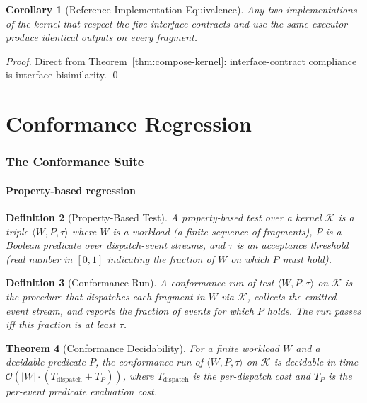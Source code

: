\documentclass[twocolumn,11pt,a4paper]{article}
\newtheorem{theorem}{Theorem}[section]
\newtheorem{corollary}[theorem]{Corollary}
\newtheorem{definition}[theorem]{Definition}
\DeclareMathOperator{\dispatch}{dispatch}
\newcommand{\Kernel}{\mathcal{K}}
\begin{document}
\begin{corollary}[Reference-Implementation Equivalence]
\label{cor:ref-impl}
Any two implementations of the kernel that respect the five interface contracts and use the same executor produce identical outputs on every fragment.
\end{corollary}

\begin{proof}
Direct from Theorem~\ref{thm:compose-kernel}: interface-contract compliance is interface bisimilarity. \qed
\end{proof}

\part{Conformance Regression}

\section{The Conformance Suite}
\label{sec:conformance}

\subsection{Property-based regression}

\begin{definition}[Property-Based Test]
\label{def:property-test}
A \emph{property-based test} over a kernel $\Kernel$ is a triple $\langle W, P, \tau \rangle$ where $W$ is a workload (a finite sequence of fragments), $P$ is a Boolean predicate over dispatch-event streams, and $\tau$ is an acceptance threshold (real number in $[0, 1]$ indicating the fraction of $W$ on which $P$ must hold).
\end{definition}

\begin{definition}[Conformance Run]
\label{def:conformance-run}
A \emph{conformance run} of test $\langle W, P, \tau \rangle$ on $\Kernel$ is the procedure that dispatches each fragment in $W$ via $\Kernel$, collects the emitted event stream, and reports the fraction of events for which $P$ holds. The run \emph{passes} iff this fraction is at least $\tau$.
\end{definition}

\begin{theorem}[Conformance Decidability]
\label{thm:conformance}
For a finite workload $W$ and a decidable predicate $P$, the conformance run of $\langle W, P, \tau \rangle$ on $\Kernel$ is decidable in time $\mathcal{O}(|W| \cdot (T_{\dispatch} + T_P))$, where $T_{\dispatch}$ is the per-dispatch cost and $T_P$ is the per-event predicate evaluation cost.
\end{theorem}
\end{document}
